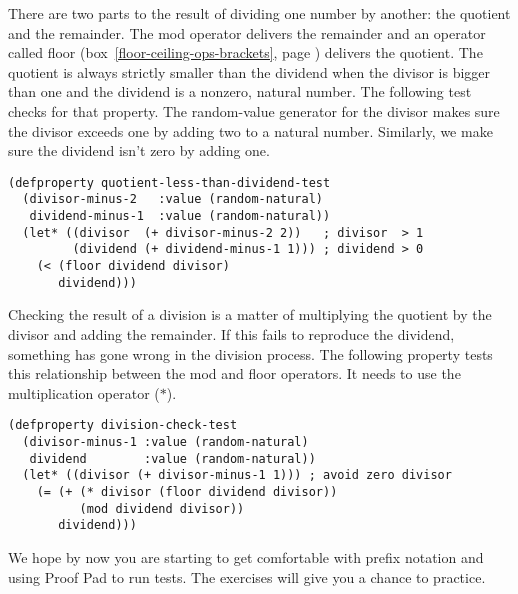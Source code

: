 There are two parts to the result
of dividing one number by another: the quotient and the remainder.
The \textsf{mod} operator delivers the remainder
and an operator called \textsf{floor}
(box~\ref{floor-ceiling-ops-brackets}, page \pageref{floor-ceiling-ops-brackets})
delivers the quotient.
The quotient is always strictly smaller
than the dividend when the divisor is bigger than one
and the dividend is a nonzero, natural number.
The following test checks for that property.
The random-value generator for the divisor
makes sure the divisor exceeds one by adding two
to a natural number.
Similarly, we make sure the dividend isn't zero by adding one.

\label{quotient-less-than-dividend-test}
\begin{code}
\begin{verbatim}
(defproperty quotient-less-than-dividend-test
  (divisor-minus-2   :value (random-natural)
   dividend-minus-1  :value (random-natural))
  (let* ((divisor  (+ divisor-minus-2 2))   ; divisor  > 1
         (dividend (+ dividend-minus-1 1))) ; dividend > 0
    (< (floor dividend divisor)
       dividend)))
\end{verbatim}
\end{code}

Checking the result of a division is a matter
of multiplying the quotient by the divisor and adding the remainder.
If this fails to reproduce the dividend,
something has gone wrong in the division process.
The following property tests this relationship
between the \textsf{mod} and \textsf{floor} operators.
It needs to use the multiplication operator ($*$).

\label{division-check-test}
\begin{code}
\begin{verbatim}
(defproperty division-check-test
  (divisor-minus-1 :value (random-natural)
   dividend        :value (random-natural))
  (let* ((divisor (+ divisor-minus-1 1))) ; avoid zero divisor
    (= (+ (* divisor (floor dividend divisor))
          (mod dividend divisor))
       dividend)))
\end{verbatim}
\end{code}

We hope by now you are starting to get comfortable with prefix notation
and using Proof Pad to run tests.
The exercises will give you a chance to practice.

